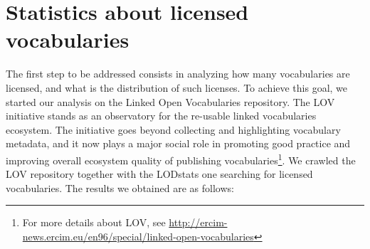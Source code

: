 \section{Statistics about licensed vocabularies}
\label{sec:stats-license}

The first step to be addressed consists in analyzing how many vocabularies are licensed, and what is the distribution of such licenses. To achieve this goal, we started our analysis on the Linked Open Vocabularies repository. The LOV initiative stands as an observatory for the re-usable linked vocabularies ecosystem. The initiative goes beyond collecting and highlighting vocabulary metadata, and it now plays a major social role in promoting good practice and improving overall ecosystem quality of publishing vocabularies\footnote{For more details about LOV, see \url{http://ercim-news.ercim.eu/en96/special/linked-open-vocabularies}}. We crawled the LOV repository together with the LODstats one searching for licensed vocabularies. The results we obtained are as follows:
